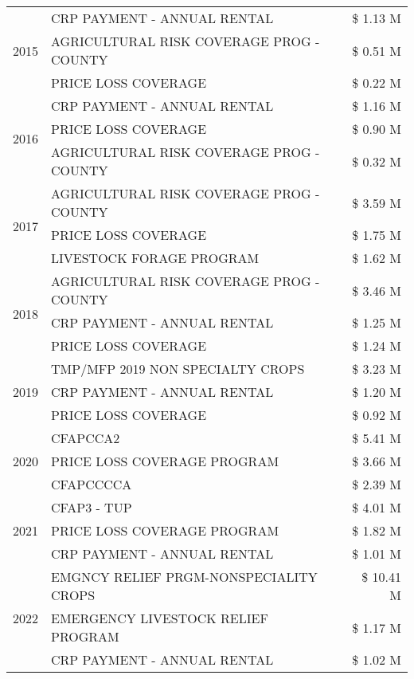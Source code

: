 \begin{tabular}{llr}
\cline{1-3}
\multirow[t]{3}{*}{2015} & CRP PAYMENT - ANNUAL RENTAL & \$ 1.13 M \\
 & AGRICULTURAL RISK COVERAGE PROG - COUNTY & \$ 0.51 M \\
 & PRICE LOSS COVERAGE & \$ 0.22 M \\
\cline{1-3}
\multirow[t]{3}{*}{2016} & CRP PAYMENT - ANNUAL RENTAL & \$ 1.16 M \\
 & PRICE LOSS COVERAGE & \$ 0.90 M \\
 & AGRICULTURAL RISK COVERAGE PROG - COUNTY & \$ 0.32 M \\
\cline{1-3}
\multirow[t]{3}{*}{2017} & AGRICULTURAL RISK COVERAGE PROG - COUNTY & \$ 3.59 M \\
 & PRICE LOSS COVERAGE & \$ 1.75 M \\
 & LIVESTOCK FORAGE PROGRAM & \$ 1.62 M \\
\cline{1-3}
\multirow[t]{3}{*}{2018} & AGRICULTURAL RISK COVERAGE PROG - COUNTY & \$ 3.46 M \\
 & CRP PAYMENT - ANNUAL RENTAL & \$ 1.25 M \\
 & PRICE LOSS COVERAGE & \$ 1.24 M \\
\cline{1-3}
\multirow[t]{3}{*}{2019} & TMP/MFP 2019 NON SPECIALTY CROPS & \$ 3.23 M \\
 & CRP PAYMENT - ANNUAL RENTAL & \$ 1.20 M \\
 & PRICE LOSS COVERAGE & \$ 0.92 M \\
\cline{1-3}
\multirow[t]{3}{*}{2020} & CFAPCCA2 & \$ 5.41 M \\
 & PRICE LOSS COVERAGE PROGRAM & \$ 3.66 M \\
 & CFAPCCCCA & \$ 2.39 M \\
\cline{1-3}
\multirow[t]{3}{*}{2021} & CFAP3 - TUP & \$ 4.01 M \\
 & PRICE LOSS COVERAGE PROGRAM & \$ 1.82 M \\
 & CRP PAYMENT - ANNUAL RENTAL & \$ 1.01 M \\
\cline{1-3}
\multirow[t]{3}{*}{2022} & EMGNCY RELIEF PRGM-NONSPECIALITY CROPS & \$ 10.41 M \\
 & EMERGENCY LIVESTOCK RELIEF PROGRAM & \$ 1.17 M \\
 & CRP PAYMENT - ANNUAL RENTAL & \$ 1.02 M \\
\cline{1-3}
\bottomrule
\end{tabular}
